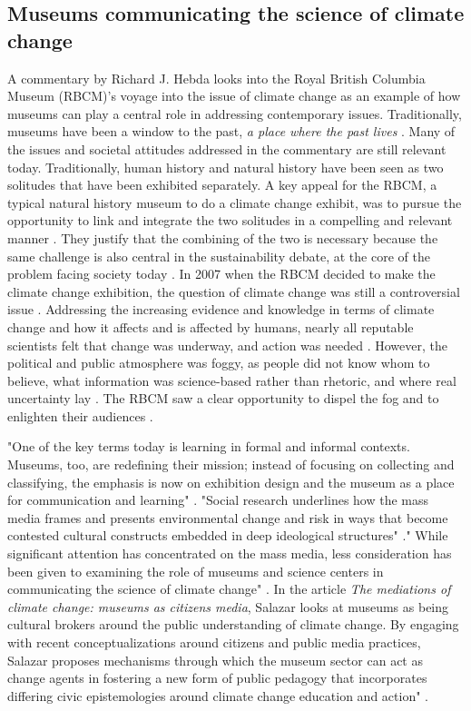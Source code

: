 \subsection{Museums communicating the science of climate change}
A commentary by Richard J. Hebda looks into the Royal British Columbia Museum (RBCM)’s voyage into the issue of climate change as an example of how museums can play a central role in addressing contemporary issues. Traditionally, museums have been a window to the past, \emph{a place where the past lives} \autocite[p. 1]{hebda_article}. Many of the issues and societal attitudes addressed in the commentary are still relevant today. Traditionally, human history and natural history have been seen as two solitudes that have been exhibited separately. A key appeal for the RBCM, a typical natural history museum to do a climate change exhibit, was to pursue the opportunity to link and integrate the two solitudes in a compelling and relevant manner \autocite[p. 2]{hebda_article}. They justify that the combining of the two is necessary because the same challenge is also central in the sustainability debate, at the core of the problem facing society today \autocite[p.2]{hebda_article}. In 2007 when the RBCM decided to make the climate change exhibition, the question of climate change was still a controversial issue \autocite[p.2]{hebda_article}. Addressing the increasing evidence and knowledge in terms of climate change and how it affects and is affected by humans, nearly all reputable scientists felt that change was underway, and action was needed \autocite[p.2]{hebda_article}. However, the political and public atmosphere was foggy, as people did not know whom to believe, what information was science-based rather than rhetoric, and where real uncertainty lay \autocite[p.2]{hebda_article}. The RBCM saw a clear opportunity to dispel the fog and to enlighten their audiences \autocite[p.2]{hebda_article}.

"One of the key terms today is learning in formal and informal contexts. Museums, too, are redefining their mission; instead of focusing on collecting and classifying, the emphasis is now on exhibition design and the museum as a place for communication and learning" \autocite[p. 8]{insulander_designs_2009}. "Social research underlines how the mass media frames and presents environmental change and risk in ways that become contested cultural constructs embedded in deep ideological structures" \autocite[p. 1]{salazar_mediations_2011}." While significant attention has concentrated on the mass media, less consideration has been given to examining the role of museums and science centers in communicating the science of climate change" \autocite[p. 1]{salazar_mediations_2011}. In the article \emph{The mediations of climate change: museums as citizens media}, Salazar looks at museums as being cultural brokers around the public understanding of climate change. By engaging with recent conceptualizations around citizens and public media practices, Salazar proposes mechanisms through which the museum sector can act as change agents in fostering a new form of public pedagogy that incorporates differing civic epistemologies around climate change education and action" \autocite[p. 1]{salazar_mediations_2011}.
